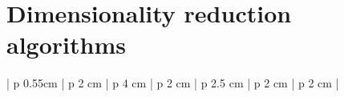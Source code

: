 \section{Dimensionality reduction algorithms}
\begin{table*}[h]
    \caption{A tabular summary of popular dimensionality reduction algorithms. Linear dimensionality reduction algorithms are those whose features in reduced dimension are linear combinations of the input features, and the others are known as non-linear algorithms. Supervised dimensionality reduction methods are those that require labelled datasets for dimensionality reduction. \label{table:dim-red}
}
  \begin{center}
        \begin{tabular} { | p {0.55cm} | p {2 cm} | p {4 cm} | p {2 cm} | p {2.5 cm} | p {2 cm} | p {2 cm} |}
        

\end{tabular}
\end{center}
\end{table*}
